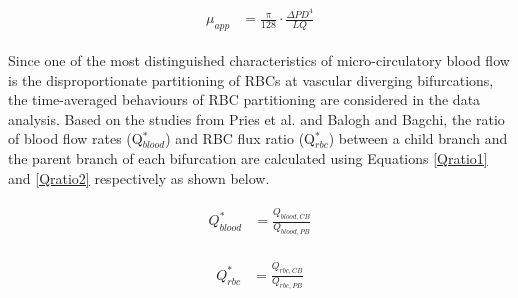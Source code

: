 \begin{eqnarray}
\label{HagenPoiseuilleEqn2}
\begin{aligned}
\mu_{app} & = \frac{\pi}{128} \cdot \frac{\Delta PD^{4}}{LQ}
\end{aligned}
\end{eqnarray}

\bigskip

\noindent Since one of the most distinguished characteristics of micro-circulatory blood flow is the disproportionate partitioning of RBCs at vascular diverging bifurcations, the time-averaged behaviours of RBC partitioning are considered in the data analysis. Based on the studies from Pries et al.\cite{PRIES198981} and Balogh and Bagchi\cite{Balogh2018}, the ratio of blood flow rates (Q$^{*}_{blood}$) and RBC flux ratio (Q$^{*}_{rbc}$) between a child branch and the parent branch of each bifurcation are calculated using Equations \ref{Qratio1} and \ref{Qratio2} respectively as shown below.

\begin{eqnarray}
\label{Qratio1}
\begin{aligned}
Q^{*}_{blood} & = \frac{Q_{blood,CB}}{Q_{blood,PB}} 
\end{aligned}
\end{eqnarray}

\begin{eqnarray}
\label{Qratio2}
\begin{aligned}
Q^{*}_{rbc} & = \frac{Q_{rbc,CB}}{Q_{rbc,PB}} 
\end{aligned}
\end{eqnarray}